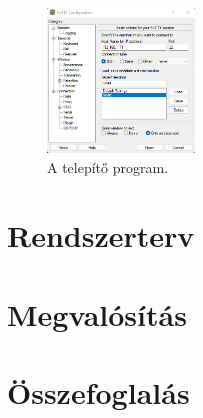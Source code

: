\documentclass[a4paper,12pt,oneside]{report}
\begin{document}
\begin{figure}[htbp]
	\centering
	\includegraphics[width=0.35\textwidth]{fig/putty.png}
	\caption{A telepítő program.}
	\label{fig-putty}
\end{figure}

\chapter{Rendszerterv}




\chapter{Megvalósítás}


\chapter{Összefoglalás}
\end{document}

